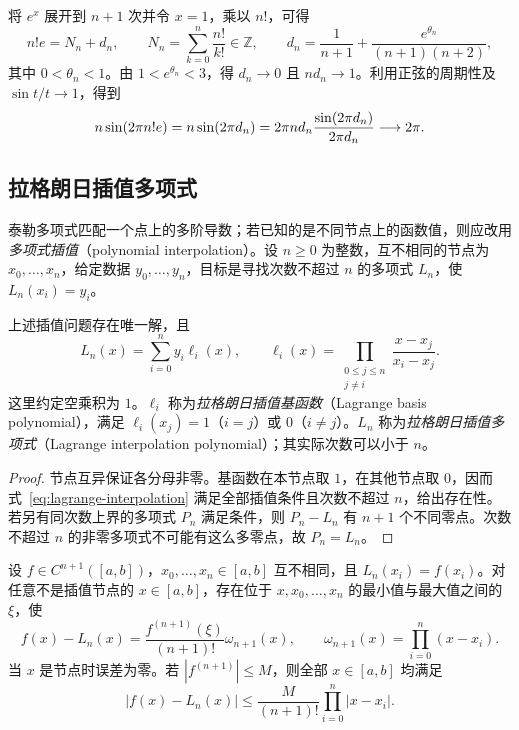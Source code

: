 \begin{solve}
将 $e^x$ 展开到 $n+1$ 次并令 $x=1$，乘以 $n!$，可得
\[
    n!e=N_n+d_n,\qquad
    N_n=\sum_{k=0}^n\frac{n!}{k!}\in\mathbb{Z},\qquad
    d_n=\frac1{n+1}+\frac{e^{\theta_n}}{(n+1)(n+2)},
\]
其中 $0<\theta_n<1$。由 $1<e^{\theta_n}<3$，得 $d_n\to0$ 且 $nd_n\to1$。利用正弦的周期性及 $\sin t/t\to1$，得到
\[
    n\sin(2\pi n!e)=n\sin(2\pi d_n)
    =2\pi nd_n\frac{\sin(2\pi d_n)}{2\pi d_n}\longrightarrow2\pi.
    \qedhere
\]
\end{solve}

\subsection{拉格朗日插值多项式}
\label{subsec:lagrange-interpolation-polynomial}

泰勒多项式匹配一个点上的多阶导数；若已知的是不同节点上的函数值，则应改用\emph{多项式插值}（polynomial interpolation）。设 $n\geq0$ 为整数，互不相同的节点为 $x_0,\ldots,x_n$，给定数据 $y_0,\ldots,y_n$，目标是寻找次数不超过 $n$ 的多项式 $L_n$，使 $L_n(x_i)=y_i$。

\begin{theorem}[拉格朗日插值公式]
\label{thm:lagrange-interpolation}
上述插值问题存在唯一解，且
\begin{equation}
    L_n(x)=\sum_{i=0}^n y_i\ell_i(x),\qquad
    \ell_i(x)=\prod_{\substack{0\leq j\leq n\\j\neq i}}
                  \frac{x-x_j}{x_i-x_j}.
    \label{eq:lagrange-interpolation}
\end{equation}
这里约定空乘积为 $1$。$\ell_i$ 称为\emph{拉格朗日插值基函数}（Lagrange basis polynomial），满足 $\ell_i(x_j)=1$（$i=j$）或 $0$（$i\neq j$）。$L_n$ 称为\emph{拉格朗日插值多项式}（Lagrange interpolation polynomial）；其实际次数可以小于 $n$。
\end{theorem}

\begin{proof}
节点互异保证各分母非零。基函数在本节点取 $1$，在其他节点取 $0$，因而式~\eqref{eq:lagrange-interpolation} 满足全部插值条件且次数不超过 $n$，给出存在性。若另有同次数上界的多项式 $P_n$ 满足条件，则 $P_n-L_n$ 有 $n+1$ 个不同零点。次数不超过 $n$ 的非零多项式不可能有这么多零点，故 $P_n=L_n$。
\end{proof}

\begin{theorem}[插值余项]
\label{thm:lagrange-interpolation-remainder}
设 $f\in C^{n+1}([a,b])$，$x_0,\ldots,x_n\in[a,b]$ 互不相同，且 $L_n(x_i)=f(x_i)$。对任意不是插值节点的 $x\in[a,b]$，存在位于 $x,x_0,\ldots,x_n$ 的最小值与最大值之间的 $\xi$，使
\begin{equation}
    f(x)-L_n(x)=\frac{f^{(n+1)}(\xi)}{(n+1)!}\omega_{n+1}(x),
    \qquad \omega_{n+1}(x)=\prod_{i=0}^n(x-x_i).
    \label{eq:lagrange-interpolation-remainder}
\end{equation}
当 $x$ 是节点时误差为零。若 $|f^{(n+1)}|\leq M$，则全部 $x\in[a,b]$ 均满足
\[
    |f(x)-L_n(x)|\leq\frac{M}{(n+1)!}
        \prod_{i=0}^n|x-x_i|.
\]
\end{theorem}

